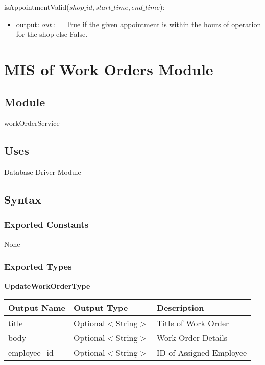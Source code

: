 \documentclass[12pt, titlepage]{article}
\begin{document}
\noindent isAppointmentValid($shop\_id, start\_time, end\_time$):
\begin{itemize}
	\item output: $out :=$ True if the given appointment is within the hours of operation for the shop else
	      False.
\end{itemize}

\newpage

\section{MIS of Work Orders Module} \label{mWorkOrders}
\subsection{Module}

workOrderService

\subsection{Uses}

Database Driver Module

\subsection{Syntax}

\subsubsection{Exported Constants}

None

\subsubsection{Exported Types}

\textbf{UpdateWorkOrderType}

\begin{table}[H]
	\begin{tabular}{|p{}|p{}|p{}|}
		\hline
		\textbf{Output Name} & \textbf{Output Type} & \textbf{Description}    \\
		\hline
		title                & Optional$<$String$>$ & Title of Work Order     \\
		\hline
		body                 & Optional$<$String$>$ & Work Order Details      \\
		\hline
		employee\_id         & Optional$<$String$>$ & ID of Assigned Employee \\
		\hline
	\end{tabular}
\end{table}
\end{document}
